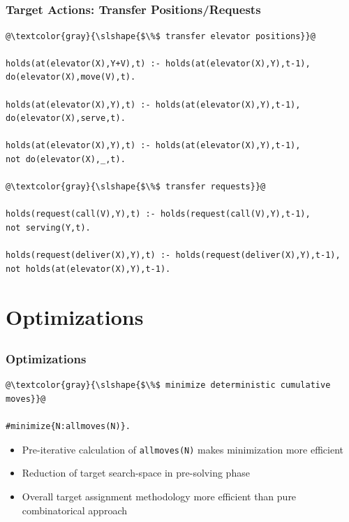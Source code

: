 \documentclass{beamer}
\begin{document}
\subsection{}
\begin{frame}[fragile]
\frametitle{Target Actions: Transfer Positions/Requests}
\begin{adjustwidth}{-1em}{-1em}
\begin{lstlisting}[basicstyle=\footnotesize\ttfamily]
@\textcolor{gray}{\slshape{$\%$ transfer elevator positions}}@

holds(at(elevator(X),Y+V),t) :- holds(at(elevator(X),Y),t-1), 
do(elevator(X),move(V),t).

holds(at(elevator(X),Y),t) :- holds(at(elevator(X),Y),t-1), 
do(elevator(X),serve,t).

holds(at(elevator(X),Y),t) :- holds(at(elevator(X),Y),t-1), 
not do(elevator(X),_,t).

@\textcolor{gray}{\slshape{$\%$ transfer requests}}@

holds(request(call(V),Y),t) :- holds(request(call(V),Y),t-1),
not serving(Y,t).

holds(request(deliver(X),Y),t) :- holds(request(deliver(X),Y),t-1), 
not holds(at(elevator(X),Y),t-1).
\end{lstlisting}
\end{adjustwidth}
\end{frame}

\section{Optimizations}
\subsection{}
\begin{frame}[fragile]
\frametitle{Optimizations}
\begin{adjustwidth}{-1em}{-1em}
\begin{lstlisting}
@\textcolor{gray}{\slshape{$\%$ minimize deterministic cumulative moves}}@

#minimize{N:allmoves(N)}.
\end{lstlisting}
\begin{itemize}
    \setlength\itemsep{1em}
    \item Pre-iterative calculation of \texttt{allmoves(N)} makes minimization more efficient
    \item Reduction of target search-space in pre-solving phase
    \item Overall target assignment methodology more efficient than pure combinatorical approach
\end{itemize}
\end{adjustwidth}
\end{frame}
\end{document}
